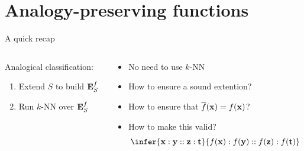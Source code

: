 \documentclass{beamer}
\begin{document}
\section[AP functions]{Analogy-preserving functions}
\begin{frame}{A quick recap}
  \begin{columns}
    \begin{column}{.4\textwidth}
      Analogical classification:
      \begin{enumerate}
        \item Extend $S$ to build $\mathbf{E}_{S}^{f}$
        \item Run $k$-NN over $\mathbf{E}_{S}^{f}$
      \end{enumerate}
    \end{column}
    \begin{column}{.6\textwidth}
      \begin{itemize}
        \item No need to use $k$-NN
        \item How to ensure a sound extention?
        \item How to ensure that $\overline{f}(\mathbf{x}) = f(\mathbf{x})$?
        \item How to make this valid?
        $$
        \infer{\mathbf{x} : \mathbf{y} ::
        \mathbf{z} : \mathbf{t}}{f(\mathbf{x}) : f(\mathbf{y}) :: f(\mathbf{z}) :
        f(\mathbf{t})}
        $$
      \end{itemize}
    \end{column}
  \end{columns}
\end{frame}
\end{document}
